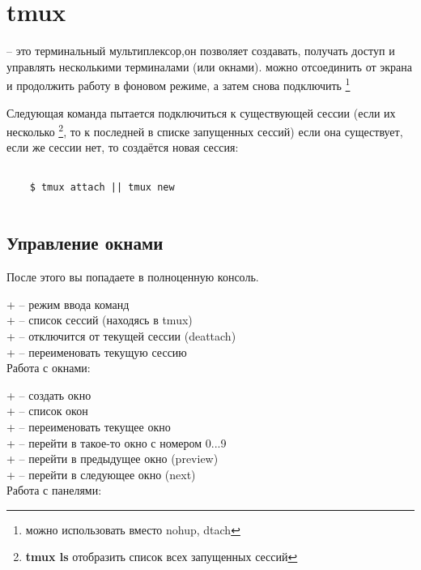 \section{tmux}

 -- это терминальный мультиплексор,он позволяет создавать, получать доступ и управлять несколькими терминалами (или окнами).  можно отсоединить от экрана и продолжить работу в фоновом режиме, а затем снова подключить \footnote{можно использовать вместо nohup, dtach}

Следующая команда пытается подключиться к существующей сессии (если их несколько \footnote{\textbf{tmux ls} отобразить список всех запущенных сессий}, то к последней в списке запущенных сессий) если она существует, если же сессии нет, то создаётся новая сессия:

\begin{lstlisting}
	
	$ tmux attach || tmux new
	
\end{lstlisting}	


\subsection*{Управление окнами}

После этого вы попадаете в полноценную консоль.

\noindent
{}+\keys{:} -- режим ввода команд\\
+ -- список сессий (находясь в tmux)\\
+ -- отключится от текущей сессии (deattach)\\
+\keys{\$} -- переименовать текущую сессию\\

Работа с окнами:

\noindent
{}+ -- создать окно\\
+ -- список окон\\
+\keys{,} -- переименовать текущее окно\\
+ -- перейти в такое-то окно с номером 0...9\\
+ -- перейти в предыдущее окно (preview)\\
+ -- перейти в следующее окно (next)\\

Работа с панелями:

